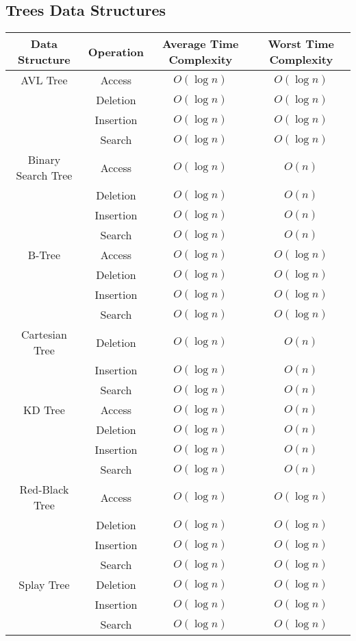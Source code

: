 \documentclass{article}
\begin{document}
\newpage
\subsection*{Trees Data Structures}

\begin{table}[ht]
	\centering
	\scriptsize
	\begin{tabular}{c ccc}
		\textbf{Data Structure} & \textbf{Operation} & \textbf{Average Time Complexity} & \textbf{Worst Time Complexity} \\
		\hline
		AVL Tree & Access & $O(\log{n})$ & $O(\log{n})$ \\
		& Deletion & $O(\log{n})$ & $O(\log{n})$ \\
		& Insertion & $O(\log{n})$ & $O(\log{n})$ \\
		& Search & $O(\log{n})$ & $O(\log{n})$ \\
		\hline
		Binary Search Tree & Access & $O(\log{n})$ & $O(n)$ \\
		& Deletion & $O(\log{n})$ & $O(n)$ \\
		& Insertion & $O(\log{n})$ & $O(n)$ \\
		& Search & $O(\log{n})$ & $O(n)$ \\
		\hline
		B-Tree & Access & $O(\log{n})$ & $O(\log{n})$ \\
		& Deletion & $O(\log{n})$ & $O(\log{n})$ \\
		& Insertion & $O(\log{n})$ & $O(\log{n})$ \\
		& Search & $O(\log{n})$ & $O(\log{n})$ \\
		\hline
		Cartesian Tree & Deletion & $O(\log{n})$ & $O(n)$ \\
		& Insertion & $O(\log{n})$ & $O(n)$ \\
		& Search & $O(\log{n})$ & $O(n)$ \\
		\hline
		KD Tree & Access & $O(\log{n})$ & $O(n)$ \\
		& Deletion & $O(\log{n})$ & $O(n)$ \\
		& Insertion & $O(\log{n})$ & $O(n)$ \\
		& Search & $O(\log{n})$ & $O(n)$ \\
		\hline
		Red-Black Tree & Access & $O(\log{n})$ & $O(\log{n})$ \\
		& Deletion & $O(\log{n})$ & $O(\log{n})$ \\
		& Insertion & $O(\log{n})$ & $O(\log{n})$ \\
		& Search & $O(\log{n})$ & $O(\log{n})$ \\
		\hline
		Splay Tree & Deletion & $O(\log{n})$ & $O(\log{n})$ \\
		& Insertion & $O(\log{n})$ & $O(\log{n})$ \\
		& Search & $O(\log{n})$ & $O(\log{n})$ \\
		\hline
	\end{tabular}
\end{table}
\end{document}
